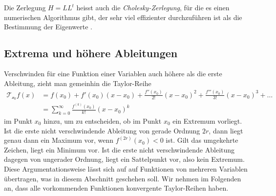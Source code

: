 Die Zerlegung $H=LL^t$ heisst auch die {\em Cholesky-Zerlegung}, für die
%
es einen numerischen Algorithmus gibt, der sehr viel effizienter
durchzuführen ist als die Bestimmung der Eigenwerte
\cite[Abschnitt 12.3]{buch:linalg}.


%
%
\subsection{Extrema und höhere Ableitungen
\label{buch:fuvar:hessesche:subsection:extrema}}
Verschwinden für eine Funktion einer Variablen auch höhere als die erste
Ableitung, zieht man gemeinhin die Taylor-Reihe
\begin{align*}
\mathscr{T_{x_0}}f(x)
&=
f(x_0) + f'(x_0)(x-x_0)
+
\frac{f''(x_0)}{2!}(x-x_0)^2
+
\frac{f'''(x_0)}{3!}(x-x_0)^3
+
\dots
\\
&=
\sum_{k=0}^\infty \frac{f^{(k)}(x_0)}{k!}(x-x_0)^k
\end{align*}
im Punkt $x_0$ hinzu, um zu entscheiden, ob im Punkt $x_0$ ein Extremum
vorliegt.
Ist die erste nicht verschwindende Ableitung von gerade Ordnung $2r$, dann
liegt genau dann ein Maximum vor, wenn $f^{(2r)}(x_0)<0$ ist.
Gilt das umgekehrte Zeichen, liegt ein Minimum vor.
Ist die erste nicht verschwindende Ableitung dagegen von ungerader Ordnung,
liegt ein Sattelpunkt vor, also kein Extremum.
Diese Argumentationsweise lässt sich auf auf Funktionen von mehreren
Variablen übertragen, was in diesem Abschnitt geschehen soll.
Wir nehmen im Folgenden an, dass alle vorkommenden Funktionen konvergente
Taylor-Reihen haben.

%
%
